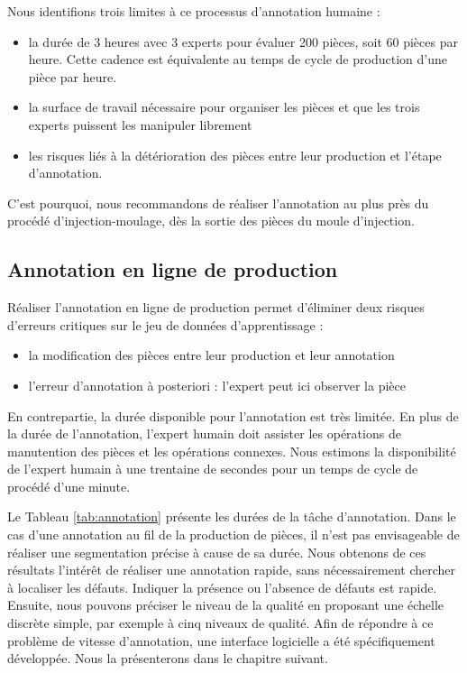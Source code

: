Nous identifions trois limites à ce processus d'annotation humaine :
\begin{itemize}
\item la durée de 3 heures avec 3 experts pour évaluer 200 pièces, soit 60 pièces par heure. Cette cadence est équivalente au temps de cycle de production d'une pièce par heure. 
\item la surface de travail nécessaire pour organiser les pièces et que les trois experts puissent les manipuler librement
\item les risques liés à la détérioration des pièces entre leur production et l'étape d'annotation.
\end{itemize}
C'est pourquoi, nous recommandons de réaliser l'annotation au plus près du procédé d'injection-moulage, dès la sortie des pièces du moule d'injection.

\subsection{Annotation en ligne de production}
Réaliser l'annotation en ligne de production permet d'éliminer deux risques d'erreurs critiques sur le jeu de données d'apprentissage :
\begin{itemize}
    \item la modification des pièces entre leur production et leur annotation
    \item l'erreur d'annotation à posteriori : l'expert peut ici observer la pièce
\end{itemize}
En contrepartie, la durée disponible pour l'annotation est très limitée. En plus de la durée de l'annotation, l'expert humain doit assister les opérations de manutention des pièces et les opérations connexes.
Nous estimons la disponibilité de l'expert humain à une trentaine de secondes pour un temps de cycle de procédé d'une minute.

Le Tableau \ref{tab:annotation} présente les durées de la tâche d'annotation.
Dans le cas d'une annotation au fil de la production de pièces, il n'est pas envisageable de réaliser une segmentation précise à cause de sa durée.
Nous obtenons de ces résultats l'intérêt de réaliser une annotation rapide, sans nécessairement chercher à localiser les défauts.
Indiquer la présence ou l'absence de défauts est rapide.
Ensuite, nous pouvons préciser le niveau de la qualité en proposant une échelle discrète simple, par exemple à cinq niveaux de qualité. Afin de répondre à ce problème de vitesse d'annotation, une interface logicielle a été spécifiquement développée.
Nous la présenterons dans le chapitre suivant.


